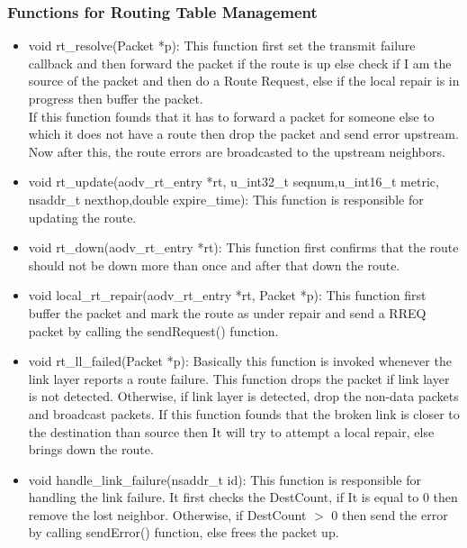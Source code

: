 \documentclass[times,10pt,onecolumn]{article}
\begin{document}
\vspace{20pt}

\subsubsection{Functions for Routing Table Management}
\label{sec:funrouting}

\begin{itemize}
\item void rt\_resolve(Packet *p): This function first set the transmit failure callback and then forward the packet if the route is up else check if I am the source of the packet and then do a Route Request, else if the local repair is in progress then buffer the packet. \\

If this function founds that it has to forward a packet for someone else to which it does not have a route then drop the packet and send error upstream. Now after this, the route errors are broadcasted to the upstream neighbors.

\vspace{05pt}
\item void rt\_update(aodv\_rt\_entry *rt, u\_int32\_t seqnum,u\_int16\_t metric, nsaddr\_t nexthop,double expire\_time): This function is responsible for updating the route.
\vspace{05pt}
\item void rt\_down(aodv\_rt\_entry *rt): This function first confirms that the route should not be down more than once and after that down the route.
\vspace{05pt}
\item void local\_rt\_repair(aodv\_rt\_entry *rt, Packet *p): This function first buffer the packet and mark the route as under repair and send a RREQ packet by calling the sendRequest() function.
\vspace{05pt}
\item void rt\_ll\_failed(Packet *p): Basically this function is invoked whenever the link layer reports a route failure. This function drops the packet if link layer is not detected. Otherwise, if link layer is detected, drop the non-data packets and broadcast packets. If this function founds that the broken link is closer to the destination than source then It will try to attempt a local repair, else brings down the route.






\vspace{05pt}
\item void handle\_link\_failure(nsaddr\_t id): This function is responsible for handling the link failure. It first checks the DestCount, if It is equal to 0 then remove the lost neighbor. Otherwise, if DestCount $>$ 0 then send the error by calling sendError() function, else frees the packet up.
\vspace{05pt}


\end{itemize}
\end{document}
